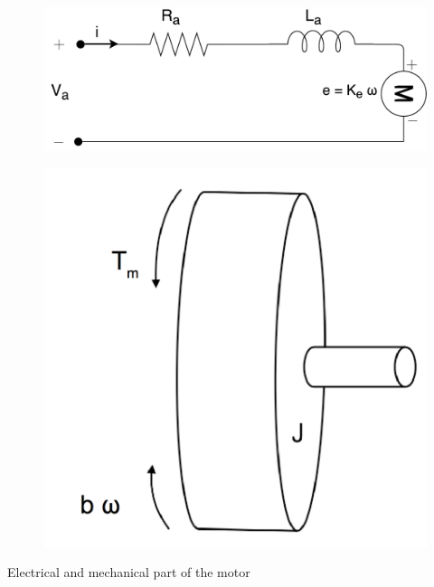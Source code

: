 \begin{table}[H]
	\begin{minipage}[b]{0.49\linewidth}
		\centering
		\begin{figure}[H]
			\centering
			\includegraphics[width=1\linewidth]{figures/BLDC_el.pdf}
		\end{figure}
	\end{minipage}\hfill
	\begin{minipage}[b]{0.49\linewidth}
		\centering
		\begin{figure}[H]
			\centering
			\includegraphics[width=0.55\linewidth]{figures/flywheel_1}
		\end{figure}
	\end{minipage}
	\caption{ Electrical and mechanical part of the motor }
	\label{fig:electromech}
\end{table}

